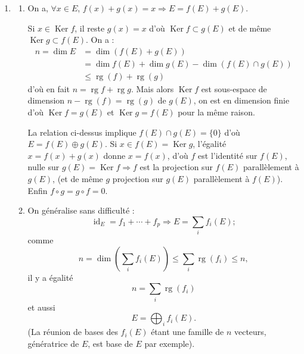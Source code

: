 \begin{enumerate}[label=\arabic*.,leftmargin=2.2em,itemsep=1.1em]
Si $x\in\operatorname{Im}r$, $r(x)=x=p(x)+q(x)-pq(x)$, soit
\[
x-p(x)=(\operatorname{id}_E-p)(x)=(\operatorname{id}_E-p)(q(x)).
\]
Mais $\operatorname{id}_E-p$ est le projecteur d'image $\operatorname{Ker} p$, de noyau $\operatorname{Im}p$, d'où comme
\[
(\operatorname{id}_E-p)(x-q(x))=0,
\]
on a $x-q(x)\in\operatorname{Im}p\Rightarrow x\in\operatorname{Im}p+\operatorname{Im}q$.

Si $x\in\operatorname{Im}p$, $r(x)=p(x)+q(x)-pq(x)$ avec $q(x)=0$ d'où $r(x)=x$ : $x\in\operatorname{Im}r$;

si $x\in\operatorname{Im}q$, $r(x)=p(x)+x-p(x)=x$, (puisque $q(x)=x$) d'où $x\in\operatorname{Im}r$.

On en déduit $\operatorname{Im}p+\operatorname{Im}q\subset\operatorname{Im}r$ et l'égalité
\[
\operatorname{Im}p\oplus\operatorname{Im}q=\operatorname{Im}r.
\]
La somme est directe car $\operatorname{Im}p\cap\operatorname{Im}q\subset\operatorname{Ker} q\cap\operatorname{Im}q=\{0\}$.

\item
\begin{enumerate}[label=\alph*),leftmargin=2em]
\item On a, $\forall x\in E$, $f(x)+g(x)=x\Rightarrow E=f(E)+g(E)$.

Si $x\in\operatorname{Ker} f$, il reste $g(x)=x$ d'où $\operatorname{Ker} f\subset g(E)$ et de même $\operatorname{Ker} g\subset f(E)$. On a :
\[
\begin{aligned}
n=\dim E&=\dim(f(E)+g(E))\\
&=\dim f(E)+\dim g(E)-\dim(f(E)\cap g(E))\\
&\le\operatorname{rg}(f)+\operatorname{rg}(g)
\end{aligned}
\]
d'où en fait $n=\operatorname{rg}f+\operatorname{rg}g$. Mais alors $\operatorname{Ker} f$ est sous-espace de dimension $n-\operatorname{rg}(f)=\operatorname{rg}(g)$ de $g(E)$, on est en dimension finie d'où $\operatorname{Ker} f=g(E)$ et $\operatorname{Ker} g=f(E)$ pour la même raison.

La relation ci-dessus implique $f(E)\cap g(E)=\{0\}$ d'où $E=f(E)\oplus g(E)$. Si $x\in f(E)=\operatorname{Ker} g$, l'égalité $x=f(x)+g(x)$ donne $x=f(x)$, d'où $f$ est l'identité sur $f(E)$, nulle sur $g(E)=\operatorname{Ker} f\Rightarrow f$ est la projection sur $f(E)$ parallèlement à $g(E)$, (et de même $g$ projection sur $g(E)$ parallèlement à $f(E)$). Enfin $f\circ g=g\circ f=0$.

\item On généralise sans difficulté :
\[
\operatorname{id}_E=f_1+\cdots+f_p\Rightarrow E=\sum_i f_i(E);
\]
comme
\[
n=\dim\left(\sum_i f_i(E)\right)\le\sum_i\operatorname{rg}(f_i)\le n,
\]
il y a égalité
\[
n=\sum_i\operatorname{rg}(f_i)
\]
et aussi
\[
E=\bigoplus_i f_i(E).
\]
(La réunion de bases des $f_i(E)$ étant une famille de $n$ vecteurs, génératrice de $E$, est base de $E$ par exemple).


\end{enumerate}
\end{enumerate}
